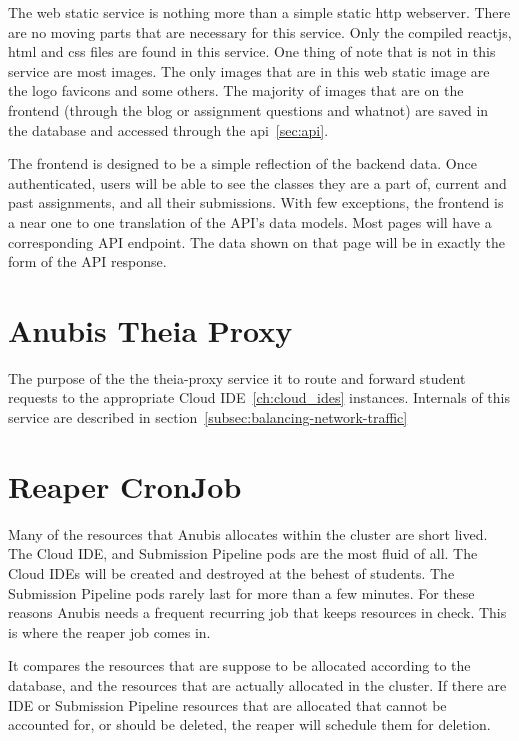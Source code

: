 The web static service is nothing more than a simple static http webserver.
There are no moving parts that are necessary for this service.
Only the compiled reactjs, html and css files are found in this service.
One thing of note that is not in this service are most images.
The only images that are in this web static image are the logo favicons
and some others.
The majority of images that are on the frontend (through the blog or assignment questions and whatnot)
are saved in the database and accessed through the api~\ref{sec:api}.

The frontend is designed to be a simple reflection of the backend data.
Once authenticated, users will be able to see the classes they are a part of,
current and past assignments, and all their submissions.
With few exceptions, the frontend is a near one to one translation of the API's data models.
Most pages will have a corresponding API endpoint.
The data shown on that page will be in exactly the form of the API response.


\section{Anubis Theia Proxy}\label{sec:theia-proxy}

The purpose of the the theia-proxy service it to route and forward student requests
to the appropriate Cloud IDE~\ref{ch:cloud_ides} instances.
Internals of this service are described in section~\ref{subsec:balancing-network-traffic}

\section{Reaper CronJob}\label{sec:reaper}

Many of the resources that Anubis allocates within the cluster are short lived.
The Cloud IDE, and Submission Pipeline pods are the most fluid of all.
The Cloud IDEs will be created and destroyed at the behest of students.
The Submission Pipeline pods rarely last for more than a few minutes. 
For these reasons Anubis needs a frequent recurring job that keeps resources in check.
This is where the reaper job comes in. 

It compares the resources that are suppose to be allocated according to 
the database, and the resources that are actually allocated in the cluster. 
If there are IDE or Submission Pipeline resources that are allocated that 
cannot be accounted for, or should be deleted, the reaper will schedule
them for deletion.

